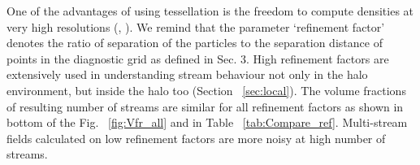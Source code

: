 One of the advantages of using tessellation is the freedom to compute densities at very high resolutions (\cite{Abel2012}, \cite{Shandarin2012}). We remind that the parameter `refinement factor' denotes the ratio of separation of the particles to the separation distance of points in the diagnostic grid as defined in Sec. 3. High refinement factors are extensively used in understanding stream behaviour not only in the halo environment, but inside the halo too (Section ~\ref{sec:local}). The volume fractions of resulting number of streams are
similar for all refinement factors as
shown in bottom of the Fig. ~\ref{fig:Vfr_all} and in Table ~\ref{tab:Compare_ref}. %
Multi-stream fields calculated on low refinement factors are more noisy at high number of streams.

